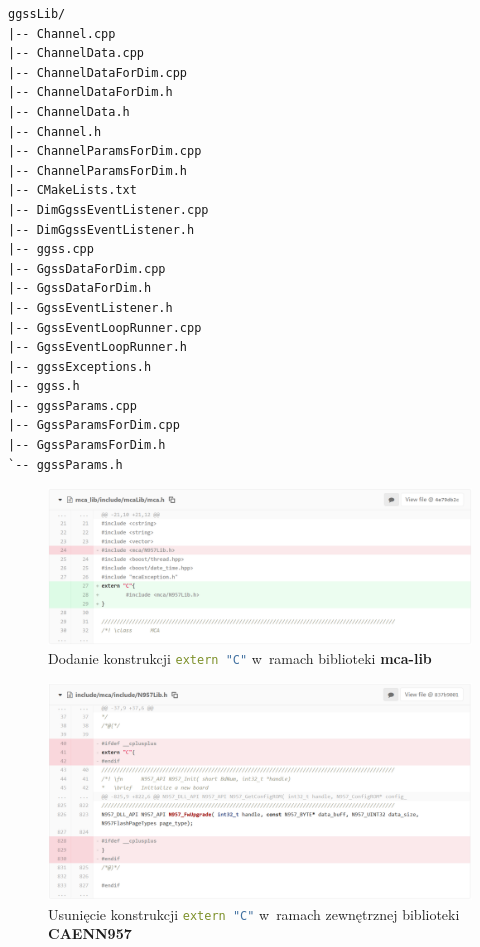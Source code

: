 \newpage

\begin{lstlisting}[caption={Pierwotna struktura biblioteki \textbf{ggss-lib}}, label={lst:oldLibStructure}]
ggssLib/
|-- Channel.cpp
|-- ChannelData.cpp
|-- ChannelDataForDim.cpp
|-- ChannelDataForDim.h
|-- ChannelData.h
|-- Channel.h
|-- ChannelParamsForDim.cpp
|-- ChannelParamsForDim.h
|-- CMakeLists.txt
|-- DimGgssEventListener.cpp
|-- DimGgssEventListener.h
|-- ggss.cpp
|-- GgssDataForDim.cpp
|-- GgssDataForDim.h
|-- GgssEventListener.h
|-- GgssEventLoopRunner.cpp
|-- GgssEventLoopRunner.h
|-- ggssExceptions.h
|-- ggss.h
|-- ggssParams.cpp
|-- GgssParamsForDim.cpp
|-- GgssParamsForDim.h
`-- ggssParams.h
\end{lstlisting}
\onecolumn
\newpage

\begin{figure}
\includegraphics[width=\textwidth]{res/png/addExternC}
\caption{Dodanie konstrukcji \lstinline[language=c++]{extern "C"} w~ramach biblioteki \textbf{mca-lib}}
\label{fig:addExternC}
\end{figure}

\begin{figure}
\includegraphics[width=\textwidth]{res/png/removeExternC}
\caption{Usunięcie konstrukcji \lstinline[language=c++]{extern "C"} w~ramach zewnętrznej biblioteki \textbf{CAENN957}}
\label{fig:removeExternC}
\end{figure}

